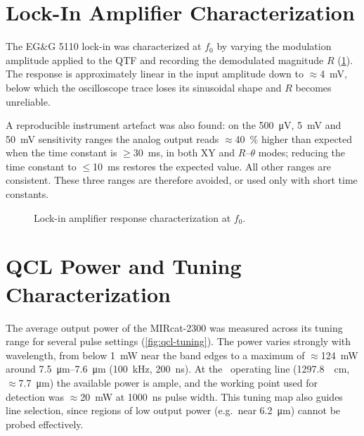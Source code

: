 \section{Lock-In Amplifier Characterization}
\label{sec:lockin-char}

The EG\&G 5110 lock-in was characterized at $f_0$ by varying the modulation
amplitude applied to the QTF and recording the demodulated magnitude $R$
(\cref{fig:lockin}). The response is approximately linear in the input amplitude
down to \(\approx\)\SI{4}{\milli\volt}, below which the oscilloscope trace loses
its sinusoidal shape and $R$ becomes unreliable.

A reproducible instrument artefact was also found: on the \SI{500}{\micro\volt},
\SI{5}{\milli\volt} and \SI{50}{\milli\volt} sensitivity ranges the analog output
reads \(\approx\)\SI{40}{\percent} higher than expected when the time constant is
\(\ge\)\SI{30}{\milli\second}, in both XY and $R$--$\theta$ modes; reducing the
time constant to \(\le\)\SI{10}{\milli\second} restores the expected value. All
other ranges are consistent. These three ranges are therefore avoided, or used
only with short time constants.

\begin{figure}[H]
  \centering
  \caption{Lock-in amplifier response characterization at $f_0$.}
  \label{fig:lockin}
\end{figure}

\section{QCL Power and Tuning Characterization}
\label{sec:qcl-char}

The average output power of the MIRcat-2300 was measured across its tuning range
for several pulse settings (\cref{fig:qcl-tuning}). The power varies strongly with
wavelength, from below \SI{1}{\milli\watt} near the band edges to a maximum of
\(\approx\)\SI{124}{\milli\watt} around \SIrange{7.5}{7.6}{\micro\meter}
(\SI{100}{\kilo\hertz}, \SI{200}{\nano\second}). At the \nto\ operating line
(\SI{1297.8}{\per\centi\meter}, \(\approx\)\SI{7.7}{\micro\meter}) the available
power is ample, and the working point used for detection was \(\approx\)\SI{20}{\milli\watt}
at \SI{1000}{\nano\second} pulse width. This tuning map also guides line
selection, since regions of low output power (e.g.\ near \SI{6.2}{\micro\meter})
cannot be probed effectively.

